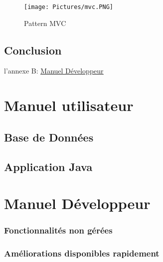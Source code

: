 \documentclass[12pt]{report}
\begin{document}
\begin{figure}[htbp]
		\centering
			\texttt{[image: Pictures/mvc.PNG]}
			\caption{\label{MVC}Pattern MVC}
			
	\end{figure}


\newpage
\section{Conclusion}
 l'annexe B: \hyperref[dev]{\underline{Manuel Développeur}} 

\newpage
\appendix
\chapter{Manuel utilisateur}

\section{Base de Données}

\newpage
\section{Application Java}


\newpage
\chapter{\label{dev}Manuel Développeur}

\subsection*{Fonctionnalités non gérées}


\subsection*{Améliorations disponibles rapidement}
\end{document}
